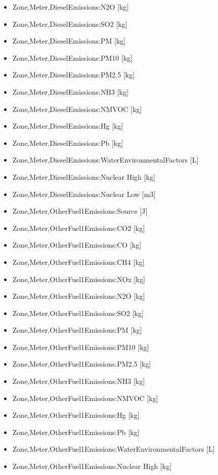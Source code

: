 \begin{itemize}
\item
  Zone,Meter,DieselEmissions:N2O {[}kg{]}
\item
  Zone,Meter,DieselEmissions:SO2 {[}kg{]}
\item
  Zone,Meter,DieselEmissions:PM {[}kg{]}
\item
  Zone,Meter,DieselEmissions:PM10 {[}kg{]}
\item
  Zone,Meter,DieselEmissions:PM2.5 {[}kg{]}
\item
  Zone,Meter,DieselEmissions:NH3 {[}kg{]}
\item
  Zone,Meter,DieselEmissions:NMVOC {[}kg{]}
\item
  Zone,Meter,DieselEmissions:Hg {[}kg{]}
\item
  Zone,Meter,DieselEmissions:Pb {[}kg{]}
\item
  Zone,Meter,DieselEmissions:WaterEnvironmentalFactors {[}L{]}
\item
  Zone,Meter,DieselEmissions:Nuclear High {[}kg{]}
\item
  Zone,Meter,DieselEmissions:Nuclear Low {[}m3{]}
\item
  Zone,Meter,OtherFuel1Emissions:Source {[}J{]}
\item
  Zone,Meter,OtherFuel1Emissions:CO2 {[}kg{]}
\item
  Zone,Meter,OtherFuel1Emissions:CO {[}kg{]}
\item
  Zone,Meter,OtherFuel1Emissions:CH4 {[}kg{]}
\item
  Zone,Meter,OtherFuel1Emissions:NOx {[}kg{]}
\item
  Zone,Meter,OtherFuel1Emissions:N2O {[}kg{]}
\item
  Zone,Meter,OtherFuel1Emissions:SO2 {[}kg{]}
\item
  Zone,Meter,OtherFuel1Emissions:PM {[}kg{]}
\item
  Zone,Meter,OtherFuel1Emissions:PM10 {[}kg{]}
\item
  Zone,Meter,OtherFuel1Emissions:PM2.5 {[}kg{]}
\item
  Zone,Meter,OtherFuel1Emissions:NH3 {[}kg{]}
\item
  Zone,Meter,OtherFuel1Emissions:NMVOC {[}kg{]}
\item
  Zone,Meter,OtherFuel1Emissions:Hg {[}kg{]}
\item
  Zone,Meter,OtherFuel1Emissions:Pb {[}kg{]}
\item
  Zone,Meter,OtherFuel1Emissions:WaterEnvironmentalFactors {[}L{]}
\item
  Zone,Meter,OtherFuel1Emissions:Nuclear High {[}kg{]}

\end{itemize}

